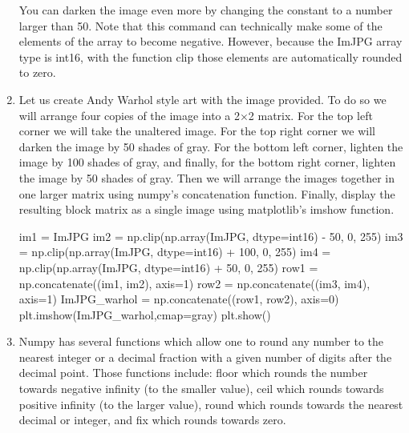 \documentclass[11pt]{article}
\newenvironment{Shaded}{}{}
\newcommand{\DecValTok}[1]{\textcolor[rgb]{0.25,0.63,0.44}{{#1}}}
\newcommand{\StringTok}[1]{\textcolor[rgb]{0.25,0.44,0.63}{{#1}}}
\newcommand{\NormalTok}[1]{{#1}}
\newcommand{\OperatorTok}[1]{\textcolor[rgb]{0.40,0.40,0.40}{{#1}}}
\begin{document}
\begin{enumerate}
  You can darken the image even more by changing the constant to a
  number larger than 50. Note that this command can technically make
  some of the elements of the array to become negative. However, because
  the ImJPG array type is int16, with the function clip those elements
  are automatically rounded to zero.
\item
  Let us create Andy Warhol style art with the image provided. To do so
  we will arrange four copies of the image into a 2×2 matrix. For the
  top left corner we will take the unaltered image. For the top right
  corner we will darken the image by 50 shades of gray. For the bottom
  left corner, lighten the image by 100 shades of gray, and finally, for
  the bottom right corner, lighten the image by 50 shades of gray. Then
  we will arrange the images together in one larger matrix using numpy's
  concatenation function. Finally, display the resulting block matrix as
  a single image using matplotlib's imshow function.

\begin{Shaded}
\begin{tcolorbox}[breakable, size=fbox, boxrule=1pt, pad at break*=1mm,colback=cellbackground, colframe=cellborder]
  \begin{Highlighting}[]
\NormalTok{im1 }\OperatorTok{=}\NormalTok{ ImJPG}
\NormalTok{im2 }\OperatorTok{=}\NormalTok{ np.clip(np.array(ImJPG, dtype}\OperatorTok{=}\StringTok{\textquotesingle{}int16\textquotesingle{}}\NormalTok{) }\OperatorTok{{-}} \DecValTok{50}\NormalTok{, }\DecValTok{0}\NormalTok{, }\DecValTok{255}\NormalTok{)}
\NormalTok{im3 }\OperatorTok{=}\NormalTok{ np.clip(np.array(ImJPG, dtype}\OperatorTok{=}\StringTok{\textquotesingle{}int16\textquotesingle{}}\NormalTok{) }\OperatorTok{+} \DecValTok{100}\NormalTok{, }\DecValTok{0}\NormalTok{, }\DecValTok{255}\NormalTok{)}
\NormalTok{im4 }\OperatorTok{=}\NormalTok{ np.clip(np.array(ImJPG, dtype}\OperatorTok{=}\StringTok{\textquotesingle{}int16\textquotesingle{}}\NormalTok{) }\OperatorTok{+} \DecValTok{50}\NormalTok{, }\DecValTok{0}\NormalTok{, }\DecValTok{255}\NormalTok{)}
\NormalTok{row1 }\OperatorTok{=}\NormalTok{ np.concatenate((im1, im2), axis}\OperatorTok{=}\DecValTok{1}\NormalTok{)}
\NormalTok{row2 }\OperatorTok{=}\NormalTok{ np.concatenate((im3, im4), axis}\OperatorTok{=}\DecValTok{1}\NormalTok{)}
\NormalTok{ImJPG\_warhol }\OperatorTok{=}\NormalTok{ np.concatenate((row1, row2), axis}\OperatorTok{=}\DecValTok{0}\NormalTok{)}
\NormalTok{plt.imshow(ImJPG\_warhol,cmap}\OperatorTok{=}\StringTok{\textquotesingle{}gray\textquotesingle{}}\NormalTok{)}
\NormalTok{plt.show()}
\end{Highlighting}
\end{tcolorbox}
\end{Shaded}
\item
  Numpy has several functions which allow one to round any number to the
  nearest integer or a decimal fraction with a given number of digits
  after the decimal point. Those functions include: floor which rounds
  the number towards negative infinity (to the smaller value), ceil
  which rounds towards positive infinity (to the larger value), round
  which rounds towards the nearest decimal or integer, and fix which
  rounds towards zero.


\end{enumerate}
\end{document}
